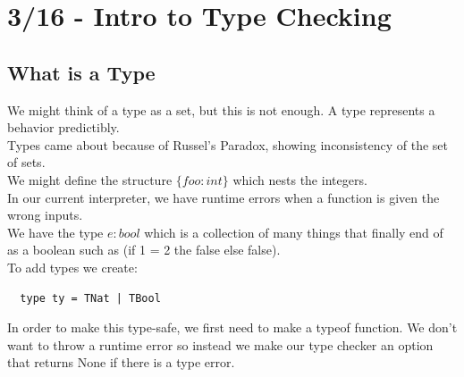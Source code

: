 \section{3/16 - Intro to Type Checking}
\subsection{What is a Type}
We might think of a type as a set, but this is not enough. A type represents a behavior predictibly.
\\
Types came about because of Russel's Paradox, showing inconsistency of the set of sets. 
\\
We might define the structure $\{ foo : int \}$ which nests the integers.
\\
In our current interpreter, we have runtime errors when a function is given the wrong inputs.
\\
We have the type $e : bool$ which is a collection of many things that finally end of as a boolean such as (if 1 = 2 the false else false).
\\
To add types we create:
\begin{lstlisting}
  type ty = TNat | TBool
\end{lstlisting}
In order to make this type-safe, we first need to make a typeof function. We don't want to throw a runtime error so instead we make our type checker an option that returns None if there is a type error.
